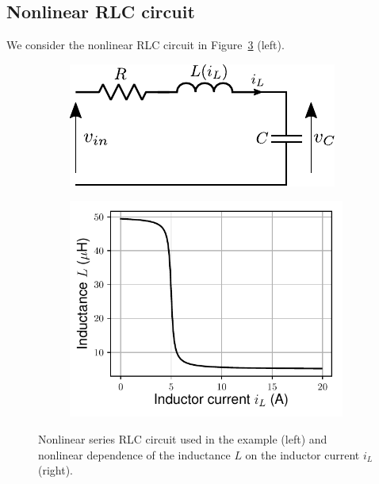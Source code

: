 \documentclass{article} %
\begin{document}
 \subsection{Nonlinear RLC circuit}
We consider the nonlinear RLC circuit in Figure~\ref{fig:RLC} (left).
\begin{figure}
\centering
\begin{subfigure}{.45\textwidth}
  \centering
  \includegraphics[width=1.0\linewidth]{fig/RLC/RLC.pdf}
  \label{fig:sub1}
\end{subfigure}%
\begin{subfigure}{.45\textwidth}
  \centering
  \includegraphics[width=.99\linewidth]{fig/RLC/RLC_characteristics}
  \label{fig:sub2}
\end{subfigure}
\caption{Nonlinear series RLC circuit used in the example (left) and nonlinear dependence of the inductance $L$ on the  inductor current $i_L$  (right).}
\label{fig:RLC}
\end{figure}
\end{document}
